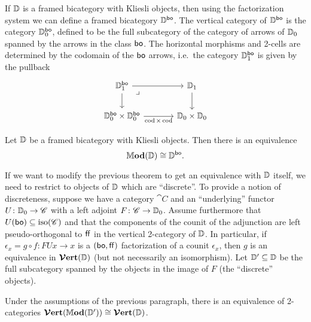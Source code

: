 \documentclass[12pt,oneside,article,draft]{memoir}
\begin{document}
If $\mathbb{D}$ is a framed bicategory with Kliesli objects, then using the factorization system we can define a framed bicategory $\mathbb{D}^{\mathsf{bo}}$.
The vertical category of $\mathbb{D}^{\mathsf{bo}}$ is the category $\mathbb{D}_0^{\mathsf{bo}}$, defined to be the full subcategory of the category of arrows of $\mathbb{D}_0$ spanned by the arrows in the class $\mathsf{bo}$.
The horizontal morphisms and 2-cells are determined by the codomain of the $\mathsf{bo}$ arrows, i.e.~the category $\mathbb{D}_1^{\mathsf{bo}}$ is given by the pullback
\[
\begin{tikzcd}[column sep=large]
   \dcat{D}_1^{\bo} \ar[r] \ar[d] \ar[dr,phantom,"\lrcorner" very near start]
      & \dcat{D}_1 \ar[d] \\
   \dcat{D}_0^{\bo}\times\dcat{D}_0^{\bo} \ar[r,"\cod\times\cod"']
      & \dcat{D}_0\times\dcat{D}_0
\end{tikzcd}
\]

\begin{theorem}
   Let $\mathbb{D}$ be a framed bicategory with Kliesli objects. Then there is an equivalence
   \[
      \mathbb{M}\mathbf{od}(\mathbb{D}) \cong \mathbb{D}^{\mathsf{bo}}.
   \]
\end{theorem}

If we want to modify the previous theorem to get an equivalence with $\mathbb{D}$ itself, we need to restrict to objects of $\mathbb{D}$ which are ``discrete''.
To provide a notion of discreteness, suppose we have a category $\cat{C}$ and an ``underlying'' functor $U\colon\mathbb{D}_0\to\mathscr{C}$ with a left adjoint $F\colon\mathscr{C}\to\mathbb{D}_0$.
Assume furthermore that $U(\mathsf{bo})\subseteq\mathrm{iso}(\mathscr{C})$ and that the components of the counit of the adjunction are left pseudo-orthogonal to $\mathsf{ff}$ in the vertical 2-category of $\mathbb{D}$.
In particular, if $\epsilon_x=g\circ f\colon FUx\to x$ is a $(\mathsf{bo},\mathsf{ff})$ factorization of a counit $\epsilon_x$, then $g$ is an equivalence in $\bm{\mathcal{V}}\mathbf{ert}(\mathbb{D})$ (but not necessarily an isomorphism).
Let $\mathbb{D}'\subseteq\mathbb{D}$ be the full subcategory spanned by the objects in the image of $F$ (the ``discrete'' objects).

\begin{theorem}
   Under the assumptions of the previous paragraph, there is an equivalence of 2-categories $\bm{\mathcal{V}}\mathbf{ert}(\mathbb{M}\mathbf{od}(\mathbb{D}'))\cong\bm{\mathcal{V}}\mathbf{ert}(\mathbb{D})$.
\end{theorem}
\end{document}
